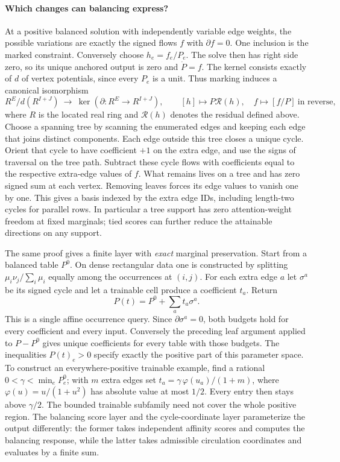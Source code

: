 \documentclass[11pt,a4paper]{article}
\theoremstyle{definition}
\theoremstyle{remark}\newaliascnt{remark}{theorem}
\numberwithin{equation}{section}
\begin{document}
\paragraph{Which changes can balancing express?}
At a positive balanced solution with independently variable edge weights, the possible variations are exactly the signed flows $f$ with $\partial f=0$. One inclusion is the marked constraint. Conversely choose $h_e=f_e/P_e$. The solve then has right side zero, so its unique anchored output is zero and $\dot P=f$. The kernel consists exactly of $d$ of vertex potentials, since every $P_e$ is a unit. Thus marking induces a canonical isomorphism
\[
       R^E/d(R^{I+J})\ \longrightarrow\ \ker(\partial:R^E\longrightarrow R^{I+J}),
       \qquad [h]\longmapsto P \mathcal R(h),\quad f\longmapsto[f/P]\ \text{in reverse},
\]
where $R$ is the located real ring and $\mathcal R(h)$ denotes the residual defined above. Choose a spanning tree by scanning the enumerated edges and keeping each edge that joins distinct components. Each edge outside this tree closes a unique cycle. Orient that cycle to have coefficient $+1$ on the extra edge, and use the signs of traversal on the tree path. Subtract these cycle flows with coefficients equal to the respective extra-edge values of $f$. What remains lives on a tree and has zero signed sum at each vertex. Removing leaves forces its edge values to vanish one by one. This gives a basis indexed by the extra edge IDs, including length-two cycles for parallel rows. In particular a tree support has zero attention-weight freedom at fixed marginals; tied scores can further reduce the attainable directions on any support.

The same proof gives a finite layer with \emph{exact} marginal preservation. Start from a balanced table $P^0$. On dense rectangular data one is constructed by splitting $\mu_i\nu_j/\sum_i\mu_i$ equally among the occurrences at $(i,j)$. For each extra edge $a$ let $\sigma^a$ be its signed cycle and let a trainable cell produce a coefficient $t_a$. Return
\[
        P(t)=P^0+\sum_a t_a\sigma^a.
\]
This is a single affine occurrence query. Since $\partial\sigma^a=0$, both budgets hold for every coefficient and every input. Conversely the preceding leaf argument applied to $P-P^0$ gives unique coefficients for every table with those budgets. The inequalities $P(t)_e>0$ specify exactly the positive part of this parameter space. To construct an everywhere-positive trainable example, find a rational $0<\gamma<\min_e P_e^0$; with $m$ extra edges set $t_a=\gamma\,\varphi(u_a)/(1+m)$, where $\varphi(u)=u/(1+u^2)$ has absolute value at most $1/2$. Every entry then stays above $\gamma/2$. The bounded trainable subfamily need not cover the whole positive region. The balancing score layer and the cycle-coordinate layer parameterize the output differently: the former takes independent affinity scores and computes the balancing response, while the latter takes admissible circulation coordinates and evaluates by a finite sum.
\end{document}
